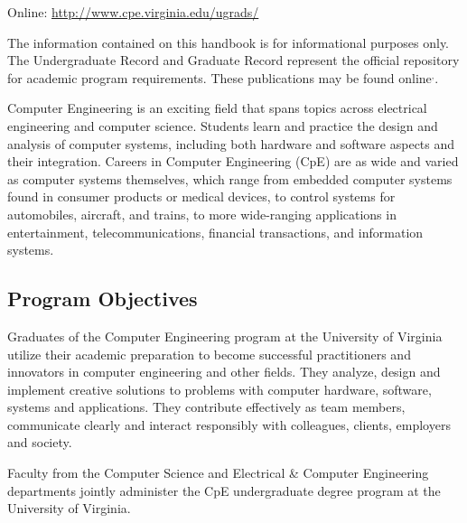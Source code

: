 \noindent Online: \url{http://www.cpe.virginia.edu/ugrads/}


The information contained on this handbook is for informational
purposes only. The Undergraduate Record and Graduate Record represent
the official repository for academic program requirements. These
publications may be found online$^,$.



Computer Engineering is an exciting field that spans topics across
electrical engineering and computer science.  Students learn and
practice the design and analysis of computer systems, including both
hardware and software aspects and their integration. Careers in
Computer Engineering (CpE) are as wide and varied as computer systems
themselves, which range from embedded computer systems found in
consumer products or medical devices, to control systems for
automobiles, aircraft, and trains, to more wide-ranging applications
in entertainment, telecommunications, financial transactions, and
information systems.


\subsection{Program Objectives}

Graduates of the Computer Engineering program at the
University of Virginia utilize their academic preparation
to become successful practitioners and innovators in
computer engineering and other fields. They analyze,
design and implement creative solutions to problems
with computer hardware, software, systems and
applications. They contribute effectively as team
members, communicate clearly and interact responsibly
with colleagues, clients, employers and society.

Faculty from the Computer Science and Electrical \& Computer
Engineering departments jointly administer the CpE undergraduate
degree program at the University of Virginia.

